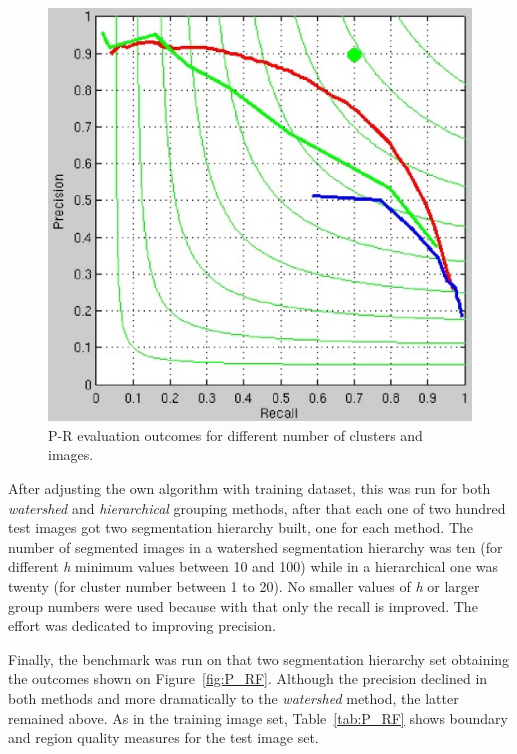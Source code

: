 \documentclass[10pt,twocolumn,letterpaper]{article}
\begin{document}
\begin{figure}
\begin{center}
   \includegraphics[width=0.8\linewidth]{pFall_rRaise.eps}
\end{center}
   \caption{P-R evaluation outcomes for different number of clusters and images.}
\label{fig:pFall_rRaise}
\end{figure}

After adjusting the own algorithm with training dataset, this was run for both \textit{watershed} and \textit{hierarchical} grouping methods, after that each one of two hundred test images got two segmentation hierarchy built, one for each method. The number of segmented images in a watershed segmentation hierarchy was ten (for different \textit{h} minimum values between 10 and 100) while in a hierarchical one was twenty (for cluster number between 1 to 20). No smaller values of \textit{h} or larger group numbers were used because with that only the recall is improved. The effort was dedicated to improving precision.

Finally, the benchmark was run on that two segmentation hierarchy set obtaining the outcomes shown on Figure~\ref{fig:P_RF}. Although the precision declined in both methods and more dramatically to the \textit{watershed} method, the latter remained above. As in the training image set, Table~\ref{tab:P_RF} shows boundary and region quality measures for the test image set.
\end{document}
